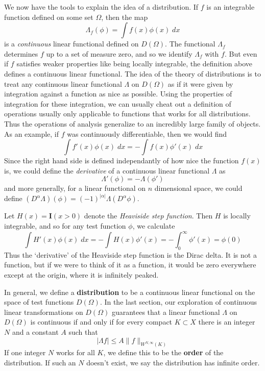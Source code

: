 We now have the tools to explain the idea of a distribution. If $f$ is an integrable function defined on some set $\Omega$, then the map
%
\[ \Lambda_f(\phi) = \int f(x) \phi(x)\; dx \]
%
is a {\it continuous} linear functional defined on $D(\Omega)$. The functional $\Lambda_f$ determines $f$ up to a set of measure zero, and so we identify $\Lambda_f$ with $f$. But even if $f$ satisfies weaker properties like being locally integrable, the definition above defines a continuous linear functional. The idea of the theory of distributions is to treat any continuous linear functional $\Lambda$ on $D(\Omega)$ as if it were given by integration against a function as nice as possible. Using the properties of integration for these integration, we can usually cheat out a definition of operations usually only applicable to functions that works for all distributions. Thus the operations of analysis generalize to an incredibly large family of objects. As an example, if $f$ was continuously differentiable, then we would find
%
\[ \int f'(x) \phi(x)\; dx = - \int f(x) \phi'(x)\; dx \]
%
Since the right hand side is defined independantly of how nice the function $f(x)$ is, we could define the {\it derivative} of a continuous linear functional $\Lambda$ as
%
\[ \Lambda'(\phi) = - \Lambda(\phi') \]
%
and more generally, for a linear functional on $n$ dimensional space, we could define $(D^\alpha \Lambda)(\phi) = (-1)^{|\alpha|} \Lambda(D^\alpha \phi)$.

\begin{example}
    Let $H(x) = \mathbf{I}(x > 0)$ denote the {\it Heaviside step function}. Then $H$ is locally integrable, and so for any test function $\phi$, we calculate
    \[ \int H'(x) \phi(x)\; dx = - \int H(x) \phi'(x) = - \int_0^\infty \phi'(x) = \phi(0) \]
    Thus the `derivative' of the Heaviside step function is the Dirac delta. It is not a function, but if we were to think of it as a function, it would be zero everywhere except at the origin, where it is infinitely peaked.
\end{example}

In general, we define a {\bf distribution} to be a continuous linear functional on the space of test functions $D(\Omega)$. In the last section, our exploration of continuous linear transformations on $D(\Omega)$ guarantees that a linear functional $\Lambda$ on $D(\Omega)$ is continuous if and only if for every compact $K \subset X$ there is an integer $N$ and a constant $A$ such that
%
\[ |\Lambda f| \leq A \| f \|_{W^{N,\infty}(K)} \]
%
If one integer $N$ works for all $K$, we define this to be the {\bf order} of the distribution. If such an $N$ doesn't exist, we say the distribution has infinite order.

